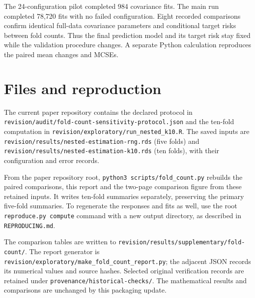 \documentclass[11pt,a4paper]{article}
\begin{document}
The 24-configuration pilot completed 984 covariance fits. The main run completed 78,720 fits with no failed configuration. Eight recorded comparisons confirm identical full-data covariance parameters and conditional target risks between fold counts. Thus the final prediction model and its target risk stay fixed while the validation procedure changes. A separate Python calculation reproduces the paired mean changes and MCSEs.

\section*{Files and reproduction}
\begingroup\raggedright
The current paper repository contains the declared protocol in
\nolinkurl{revision/audit/fold-count-sensitivity-protocol.json} and the ten-fold
computation in \nolinkurl{revision/exploratory/run_nested_k10.R}. The saved inputs
are \nolinkurl{revision/results/nested-estimation-rng.rds} (five folds) and
\nolinkurl{revision/results/nested-estimation-k10.rds} (ten folds), with their
configuration and error records.

From the paper repository root, \texttt{python3 scripts/fold\_count.py} rebuilds
the paired comparisons, this report and the two-page comparison figure from
these retained inputs. It writes ten-fold summaries separately, preserving the
primary five-fold summaries. To regenerate the responses and fits as well, use
the root \texttt{reproduce.py compute} command with a new output directory,
as described in \nolinkurl{REPRODUCING.md}.

The comparison tables are written to
\nolinkurl{revision/results/supplementary/fold-count/}. The report generator is
\nolinkurl{revision/exploratory/make_fold_count_report.py}; the adjacent JSON
records its numerical values and source hashes. Selected original verification
records are retained under \nolinkurl{provenance/historical-checks/}.
The mathematical results and comparisons are unchanged by this packaging update.
\par\endgroup
\end{document}
